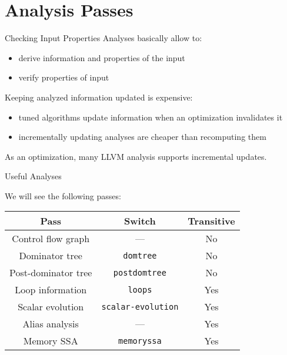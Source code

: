 
\section{Analysis Passes}


\begin{frame}{Checking Input Properties}
Analyses basically allow to:
\begin{itemize}
\item \alert{derive} information and properties of the input
\item \alert{verify} properties of input
\end{itemize}

\vfill
Keeping analyzed information updated is expensive:
\begin{itemize}
\item tuned algorithms update information when an optimization
      invalidates it
\item incrementally updating analyses are cheaper than recomputing them
\end{itemize}

\vfill
As an \alert{optimization}, many LLVM analysis supports incremental updates.
\end{frame}


\begin{frame}{Useful Analyses}
\begin{center}
We will see the following passes:\\
\bigskip
\begin{tabular}{ccc}
\toprule

\multicolumn{1}{c}{\textbf{Pass}}        &
\multicolumn{1}{c}{\textbf{Switch}}      &
\multicolumn{1}{c}{\textbf{Transitive}} \\

\midrule

Control flow graph  &
---       &
No                 \\

Dominator tree    &
\texttt{domtree}  &
No               \\

Post-dominator tree   &
\texttt{postdomtree}  &
No                   \\

Loop information  &
\texttt{loops}    &
Yes              \\

Scalar evolution           &
\texttt{scalar-evolution}  &
Yes                       \\

Alias analysis    &
---  &
Yes              \\

Memory SSA  &
\texttt{memoryssa}    &
Yes               \\

\bottomrule
\end{tabular}
\end{center}
\end{frame}


